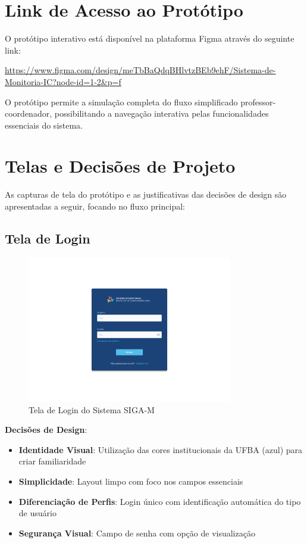 \documentclass[12pt, a4paper]{report}
\begin{document}
\section{Link de Acesso ao Protótipo}

O protótipo interativo está disponível na plataforma Figma através do seguinte link:

\url{https://www.figma.com/design/meTbBaQdqBHlvtzBEb9ehF/Sistema-de-Monitoria-IC?node-id=1-2&p=f}

O protótipo permite a simulação completa do fluxo simplificado professor-coordenador, possibilitando a navegação interativa pelas funcionalidades essenciais do sistema.

\section{Telas e Decisões de Projeto}

As capturas de tela do protótipo e as justificativas das decisões de design são apresentadas a seguir, focando no fluxo principal:

\subsection{Tela de Login}

\begin{figure}[H]
\centering
\includegraphics[width=0.8\textwidth]{figma/Login.png}
\caption{Tela de Login do Sistema SIGA-M}
\label{fig:login}
\end{figure}

\textbf{Decisões de Design}:
\begin{itemize}
    \item \textbf{Identidade Visual}: Utilização das cores institucionais da UFBA (azul) para criar familiaridade
    \item \textbf{Simplicidade}: Layout limpo com foco nos campos essenciais
    \item \textbf{Diferenciação de Perfis}: Login único com identificação automática do tipo de usuário
    \item \textbf{Segurança Visual}: Campo de senha com opção de visualização
\end{itemize}
\end{document}
